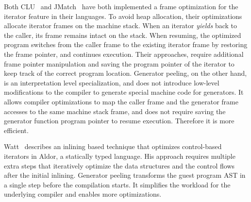 Both CLU~\cite{Atkinson1978CLU} and JMatch~\cite{Liu:2006JMatch} have both implemented a frame optimization for the iterator feature in their languages.
To avoid heap allocation, their optimizations allocate iterator frames on the machine stack.
When an iterator \emph{yields} back to the caller, its frame remains intact on the stack.
When resuming, the optimized program switches from the caller frame to the existing iterator frame by restoring the frame pointer, and continues execution.
Their approaches, require additional frame pointer manipulation and saving the program pointer of the iterator to keep track of the correct program location.
Generator peeling, on the other hand, is an interpretation level specialization, and does not introduce low-level modifications to the compiler to generate special machine code for generators.
It allows compiler optimizations to map the caller frame and the generator frame accesses to the same machine stack frame, and does not require saving the generator function program pointer to resume execution.
Therefore it is more efficient.

Watt~\cite{watt2006technique} describes an inlining based technique that optimizes control-based iterators in Aldor, a statically typed language.
His approach requires multiple extra steps that iteratively optimize the data structures and the control flows after the initial inlining. 
Generator peeling transforms the guest program AST in a single step before the compilation starts. 
It simplifies the workload for the underlying compiler and enables more optimizations.

